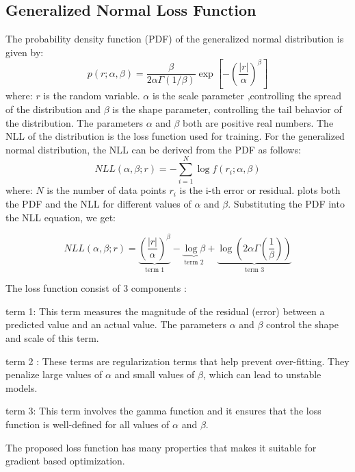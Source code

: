 \documentclass[letterpaper, 10 pt, conference]{ieeeconf}  %
\begin{document}
\subsection{Generalized Normal Loss Function}
The probability density function (PDF) of the generalized normal distribution is given by:
\begin{equation} 
p(r; \alpha, \beta) = \frac{\beta}{2\alpha\Gamma(1/\beta)} \exp \left[ -\left( \frac{|r|}{\alpha} \right)^{\beta} \right]
 \end{equation}   
where: $r$ is the random variable. $\alpha$ is the scale parameter ,controlling the spread of the distribution
and $\beta$  is the shape parameter, controlling the tail behavior of the distribution.
The parameters $\alpha$ and $\beta$ both are positive real numbers.
The NLL of the distribution is the loss function used for training. For the generalized normal distribution, the NLL can be derived from the PDF as follows: 
\begin{equation}
    NLL(\alpha, \beta; r) = -\sum_{i=1}^{N} \log f(r_i; \alpha, \beta)
\end{equation}
where: $N$ is the number of data points $r_i$ is the i-th error or residual.    plots both the PDF and the NLL for different values of $\alpha$ and $\beta$. Substituting the PDF into the NLL equation, we get:

\begin{equation}
   NLL(\alpha, \beta; r)  = \underbrace{ \left(\frac{\left|{r}\right|}{\alpha}\right)^{\beta}}_\textrm{term 1} - \underbrace{\log{\beta}}_\textrm{term 2} + \underbrace{\log{\left( 2\alpha \Gamma\left(\frac{1}{\beta}\right)\right) }}_\textrm{term 3}
\end{equation}

The loss function consist of 3 components : 
\begin{inparaenum}
    \item 
 term 1: This term measures the magnitude of the residual (error) between a predicted value and an actual value. The parameters $\alpha$ and $\beta$ control the shape and scale of this term.
     \item term 2 : These terms are regularization terms that help prevent over-fitting. They penalize large values of $\alpha$ and small values of $\beta$, which can lead to unstable models.
    \item term 3: This term involves the gamma function and it ensures that the loss function is well-defined for all values of $\alpha$ and $\beta$.
\end{inparaenum}
The proposed loss function has many properties that makes it suitable for gradient based optimization. 
\end{document}
